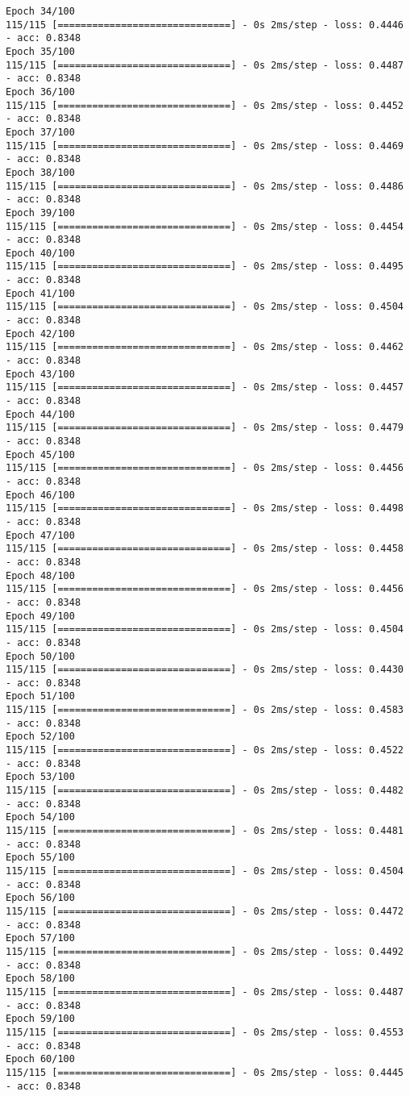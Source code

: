\documentclass[11pt]{article}
\begin{document}
\begin{Verbatim}[commandchars=\\\{\}]
Epoch 34/100
115/115 [==============================] - 0s 2ms/step - loss: 0.4446 - acc: 0.8348
Epoch 35/100
115/115 [==============================] - 0s 2ms/step - loss: 0.4487 - acc: 0.8348
Epoch 36/100
115/115 [==============================] - 0s 2ms/step - loss: 0.4452 - acc: 0.8348
Epoch 37/100
115/115 [==============================] - 0s 2ms/step - loss: 0.4469 - acc: 0.8348
Epoch 38/100
115/115 [==============================] - 0s 2ms/step - loss: 0.4486 - acc: 0.8348
Epoch 39/100
115/115 [==============================] - 0s 2ms/step - loss: 0.4454 - acc: 0.8348
Epoch 40/100
115/115 [==============================] - 0s 2ms/step - loss: 0.4495 - acc: 0.8348
Epoch 41/100
115/115 [==============================] - 0s 2ms/step - loss: 0.4504 - acc: 0.8348
Epoch 42/100
115/115 [==============================] - 0s 2ms/step - loss: 0.4462 - acc: 0.8348
Epoch 43/100
115/115 [==============================] - 0s 2ms/step - loss: 0.4457 - acc: 0.8348
Epoch 44/100
115/115 [==============================] - 0s 2ms/step - loss: 0.4479 - acc: 0.8348
Epoch 45/100
115/115 [==============================] - 0s 2ms/step - loss: 0.4456 - acc: 0.8348
Epoch 46/100
115/115 [==============================] - 0s 2ms/step - loss: 0.4498 - acc: 0.8348
Epoch 47/100
115/115 [==============================] - 0s 2ms/step - loss: 0.4458 - acc: 0.8348
Epoch 48/100
115/115 [==============================] - 0s 2ms/step - loss: 0.4456 - acc: 0.8348
Epoch 49/100
115/115 [==============================] - 0s 2ms/step - loss: 0.4504 - acc: 0.8348
Epoch 50/100
115/115 [==============================] - 0s 2ms/step - loss: 0.4430 - acc: 0.8348
Epoch 51/100
115/115 [==============================] - 0s 2ms/step - loss: 0.4583 - acc: 0.8348
Epoch 52/100
115/115 [==============================] - 0s 2ms/step - loss: 0.4522 - acc: 0.8348
Epoch 53/100
115/115 [==============================] - 0s 2ms/step - loss: 0.4482 - acc: 0.8348
Epoch 54/100
115/115 [==============================] - 0s 2ms/step - loss: 0.4481 - acc: 0.8348
Epoch 55/100
115/115 [==============================] - 0s 2ms/step - loss: 0.4504 - acc: 0.8348
Epoch 56/100
115/115 [==============================] - 0s 2ms/step - loss: 0.4472 - acc: 0.8348
Epoch 57/100
115/115 [==============================] - 0s 2ms/step - loss: 0.4492 - acc: 0.8348
Epoch 58/100
115/115 [==============================] - 0s 2ms/step - loss: 0.4487 - acc: 0.8348
Epoch 59/100
115/115 [==============================] - 0s 2ms/step - loss: 0.4553 - acc: 0.8348
Epoch 60/100
115/115 [==============================] - 0s 2ms/step - loss: 0.4445 - acc: 0.8348

\end{Verbatim}
\end{document}
